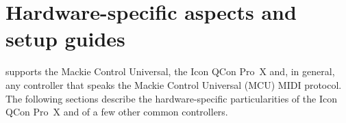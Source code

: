 \section{Hardware-specific aspects and setup guides}\label{hardware}

\mcu supports the Mackie Control Universal, the Icon QCon Pro~X and, in
general, any controller that speaks the Mackie Control Universal (MCU)
MIDI protocol. The following sections describe the hardware-specific
particularities of the Icon QCon Pro~X and of a few other common
controllers.

